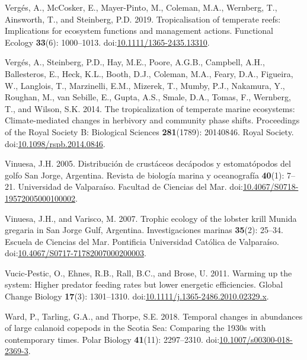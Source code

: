 \documentclass[
]{article}
\newlength{\cslhangindent}
\newenvironment{CSLReferences}[2] %
 {\begin{list}{}{%
  \setlength{\itemindent}{0pt}
  \setlength{\leftmargin}{0pt}
  \setlength{\parsep}{0pt}
  \ifodd #1
   \setlength{\leftmargin}{\cslhangindent}
   \setlength{\itemindent}{-1\cslhangindent}
  \fi
  \setlength{\itemsep}{#2\baselineskip}}}
 {\end{list}}
\begin{document}
\begin{CSLReferences}{1}{0}
Vergés, A., McCosker, E., Mayer-Pinto, M., Coleman, M.A., Wernberg, T.,
Ainsworth, T., and Steinberg, P.D. 2019. Tropicalisation of temperate
reefs: {Implications} for ecosystem functions and management actions.
Functional Ecology \textbf{33}(6): 1000--1013.
doi:\href{https://doi.org/10.1111/1365-2435.13310}{10.1111/1365-2435.13310}.

Vergés, A., Steinberg, P.D., Hay, M.E., Poore, A.G.B., Campbell, A.H.,
Ballesteros, E., Heck, K.L., Booth, D.J., Coleman, M.A., Feary, D.A.,
Figueira, W., Langlois, T., Marzinelli, E.M., Mizerek, T., Mumby, P.J.,
Nakamura, Y., Roughan, M., van Sebille, E., Gupta, A.S., Smale, D.A.,
Tomas, F., Wernberg, T., and Wilson, S.K. 2014. The tropicalization of
temperate marine ecosystems: Climate-mediated changes in herbivory and
community phase shifts. Proceedings of the Royal Society B: Biological
Sciences \textbf{281}(1789): 20140846. Royal Society.
doi:\href{https://doi.org/10.1098/rspb.2014.0846}{10.1098/rspb.2014.0846}.

Vinuesa, J.H. 2005. Distribuci{ó}n de crust{á}ceos dec{á}podos y
estomat{ó}podos del golfo {San Jorge}, {Argentina}. Revista de
biolog{í}a marina y oceanograf{í}a \textbf{40}(1): 7--21. Universidad de
Valpara{í}so. Facultad de Ciencias del Mar.
doi:\href{https://doi.org/10.4067/S0718-19572005000100002}{10.4067/S0718-19572005000100002}.

Vinuesa, J.H., and Varisco, M. 2007. Trophic ecology of the lobster
krill {Munida} gregaria in {San Jorge Gulf}, {Argentina}.
Investigaciones marinas \textbf{35}(2): 25--34. Escuela de Ciencias del
Mar. Pontificia Universidad Cat{ó}lica de Valpara{í}so.
doi:\href{https://doi.org/10.4067/S0717-71782007000200003}{10.4067/S0717-71782007000200003}.

Vucic-Pestic, O., Ehnes, R.B., Rall, B.C., and Brose, U. 2011. Warming
up the system: Higher predator feeding rates but lower energetic
efficiencies. Global Change Biology \textbf{17}(3): 1301--1310.
doi:\href{https://doi.org/10.1111/j.1365-2486.2010.02329.x}{10.1111/j.1365-2486.2010.02329.x}.

Ward, P., Tarling, G.A., and Thorpe, S.E. 2018. Temporal changes in
abundances of large calanoid copepods in the {Scotia Sea}: Comparing the
1930s with contemporary times. Polar Biology \textbf{41}(11):
2297--2310.
doi:\href{https://doi.org/10.1007/s00300-018-2369-3}{10.1007/s00300-018-2369-3}.


\end{CSLReferences}
\end{document}

